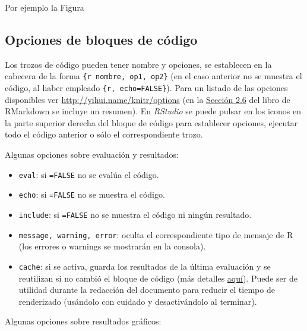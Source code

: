 \documentclass[]{book}
\providecommand{\tightlist}{%
  \setlength{\itemsep}{0pt}\setlength{\parskip}{0pt}}
\theoremstyle{definition}
\theoremstyle{definition}
\theoremstyle{definition}
\theoremstyle{remark}
\begin{document}
Por ejemplo la Figura

\subsection{Opciones de bloques de código}\label{opcodigo}

Los trozos de código pueden tener nombre y opciones, se establecen en la
cabecera de la forma
\texttt{\textasciigrave{}\textasciigrave{}\textasciigrave{}\{r\ nombre,\ op1,\ op2\}}
(en el caso anterior no se muestra el código, al haber empleado
\texttt{\textasciigrave{}\textasciigrave{}\textasciigrave{}\{r,\ echo=FALSE\}}).
Para un listado de las opciones disponibles ver
\url{http://yihui.name/knitr/options} (en la
\href{https://bookdown.org/yihui/rmarkdown/r-code.html}{Sección 2.6} del
libro de RMarkdown se incluye un resumen). En \emph{RStudio} se puede
pulsar en los iconos en la parte superior derecha del bloque de código
para establecer opciones, ejecutar todo el código anterior o sólo el
correspondiente trozo.

Algunas opciones sobre evaluación y resultados:

\begin{itemize}
\tightlist
\item
  \texttt{eval}: si \texttt{=FALSE} no se evalúa el código.
\item
  \texttt{echo}: si \texttt{=FALSE} no se muestra el código.
\item
  \texttt{include}: si \texttt{=FALSE} no se muestra el código ni ningún
  resultado.
\item
  \texttt{message,\ warning,\ error}: oculta el correspondiente tipo de
  mensaje de R (los errores o warnings se mostrarán en la consola).
\item
  \texttt{cache}: si se activa, guarda los resultados de la última
  evaluación y se reutilizan si no cambió el bloque de código (más
  detalles \href{https://yihui.name/knitr/options/\#cache}{aquí}). Puede
  ser de utilidad durante la redacción del documento para reducir el
  tiempo de renderizado (usándolo con cuidado y desactivándolo al
  terminar).
\end{itemize}

Algunas opciones sobre resultados gráficos:
\end{document}
